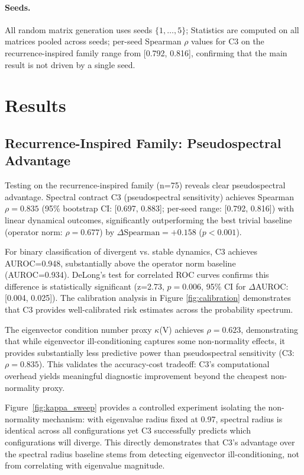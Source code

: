 \documentclass[twoside]{article}
\begin{document}
\paragraph{Seeds.} All random matrix generation uses seeds $\{1, \ldots, 5\}$; Statistics are computed on all matrices pooled across seeds; per-seed Spearman $
\rho$ values for C3 on the recurrence-inspired family range from [0.792, 0.816], confirming that the main result is not driven by a single seed.

\section{Results}
\label{sec:results}

\subsection{Recurrence-Inspired Family: Pseudospectral Advantage}

Testing on the recurrence-inspired family (n=75) reveals clear pseudospectral advantage. Spectral contract C3 (pseudospectral sensitivity) achieves Spearman $\rho = 0.835$ (95\% bootstrap CI: [0.697, 0.883]; per-seed range: [0.792, 0.816]) with linear dynamical outcomes, significantly outperforming the best trivial baseline (operator norm: $\rho=0.677$) by $\Delta\text{Spearman}=+0.158$ ($p<0.001$).

For binary classification of divergent vs. stable dynamics, C3 achieves AUROC=0.948, substantially above the operator norm baseline (AUROC=0.934). DeLong's test for correlated ROC curves confirms this difference is statistically significant (z=2.73, $p=0.006$, 95\% CI for $\Delta$AUROC: [0.004, 0.025]). The calibration analysis in Figure \ref{fig:calibration} demonstrates that C3 provides well-calibrated risk estimates across the probability spectrum.

The eigenvector condition number proxy $\kappa$(V) achieves $\rho=0.623$, demonstrating that while eigenvector ill-conditioning captures some non-normality effects, it provides substantially less predictive power than pseudospectral sensitivity (C3: $\rho=0.835$). This validates the accuracy-cost tradeoff: C3's computational overhead yields meaningful diagnostic improvement beyond the cheapest non-normality proxy.

Figure~\ref{fig:kappa_sweep} provides a controlled experiment isolating the non-normality mechanism: with eigenvalue radius fixed at 0.97, spectral radius is identical across all configurations yet C3 successfully predicts which configurations will diverge. This directly demonstrates that C3's advantage over the spectral radius baseline stems from detecting eigenvector ill-conditioning, not from correlating with eigenvalue magnitude.
\end{document}

